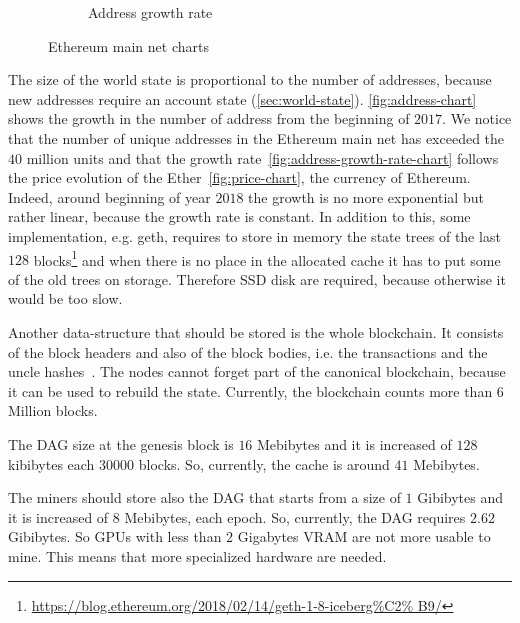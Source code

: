 \begin{figure}
\begin{subfigure}[b]{0.5\textwidth}
        \caption{Address growth rate}
        \label{fig:address-growth-rate-chart}
    \end{subfigure}
    \caption{Ethereum main net charts}
\end{figure}

The size of the world state is proportional to the number of addresses, because
new addresses require an account state (\autoref{sec:world-state}).
\autoref{fig:address-chart} shows the growth in the number of address from the
beginning of $2017$. We notice that the number of unique addresses in the
Ethereum main net has exceeded the $40$ million units and that the growth
rate~\autoref{fig:address-growth-rate-chart} follows the price evolution of the
Ether~\autoref{fig:price-chart}, the currency of Ethereum. Indeed, around
beginning of year $2018$ the growth is no more exponential but rather linear,
because the growth rate is constant.
In addition to this, some implementation, e.g. geth, requires to store in memory
the state trees of the last $128$ 
blocks\footnote{\url{https://blog.ethereum.org/2018/02/14/geth-1-8-iceberg\%C2\%
B9/}} and when there is no place in the allocated cache it has to put some of
the old trees on storage. Therefore SSD disk are required, because otherwise it
would be too slow.

Another data-structure that should be stored is the whole blockchain. It 
consists of the block headers and also of the block bodies, i.e. the 
transactions and the uncle hashes~\cite{wood2018ethereum}. The nodes cannot
forget part of the canonical blockchain, because it can be used to rebuild 
the state. Currently, the blockchain counts more than $6$ Million blocks.

The DAG size at the genesis block is $16$ Mebibytes and it is increased of $128$
kibibytes each $30000$ blocks. So, currently, the cache is around $41$ 
Mebibytes.

The miners should store also the DAG that starts from a size of $1$ Gibibytes
and it is increased of $8$ Mebibytes, each epoch. So, currently, the DAG 
requires $2.62$ Gibibytes. So GPUs with less than $2$ Gigabytes VRAM are not
more usable to mine. This means that more specialized hardware are needed.



